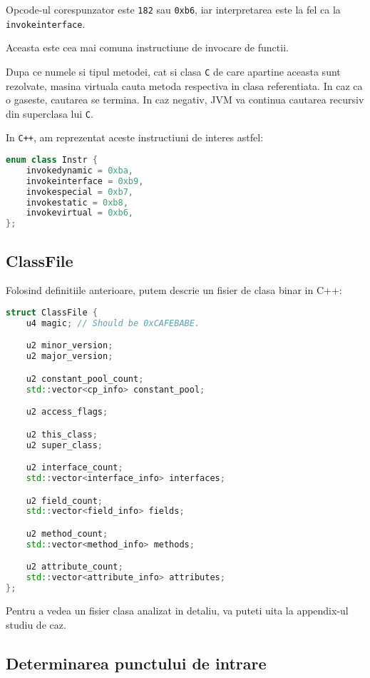 Opcode-ul corespunzator este \texttt{182} sau \texttt{0xb6}, iar
interpretarea este la fel ca la \texttt{invokeinterface}.

Aceasta este cea mai comuna instructiune de invocare de functii.

Dupa ce numele si tipul metodei, cat si clasa \texttt{C} de care
apartine aceasta sunt rezolvate, masina virtuala cauta metoda respectiva
in clasa referentiata. In caz ca o gaseste, cautarea se termina. In caz
negativ, JVM va continua cautarea recursiv din superclasa lui
\texttt{C}.

In \texttt{C++}, am reprezentat aceste instructiuni de interes astfel:

\begin{lstlisting}[language=C++]
enum class Instr {
    invokedynamic = 0xba,
    invokeinterface = 0xb9,
    invokespecial = 0xb7,
    invokestatic = 0xb8,
    invokevirtual = 0xb6,
};
\end{lstlisting}

\subsection{ClassFile}\label{classfile}

Folosind definitiile anterioare, putem descrie un fisier de clasa binar
in C++:

\begin{lstlisting}[language=C++]
struct ClassFile {
    u4 magic; // Should be 0xCAFEBABE.

    u2 minor_version;
    u2 major_version;

    u2 constant_pool_count;
    std::vector<cp_info> constant_pool;

    u2 access_flags;

    u2 this_class;
    u2 super_class;

    u2 interface_count;
    std::vector<interface_info> interfaces;

    u2 field_count;
    std::vector<field_info> fields;

    u2 method_count;
    std::vector<method_info> methods;

    u2 attribute_count;
    std::vector<attribute_info> attributes;
};
\end{lstlisting}

Pentru a vedea un fisier clasa analizat in detaliu, va puteti
uita la appendix-ul studiu de caz.



\subsection{Determinarea punctului de intrare}

